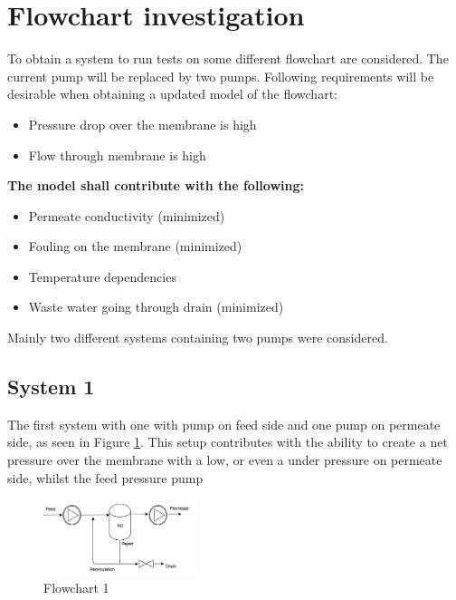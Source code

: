 
\section{Flowchart investigation}
To obtain a system to run tests on some different flowchart are considered. The current pump will be replaced by two pumps. Following requirements will be desirable when obtaining a updated model of the flowchart:
\begin{itemize}
\renewcommand\labelitemi{ }
\item Pressure drop over the membrane is high
\item Flow through membrane is high
\end{itemize}
\textbf{The model shall contribute with the following:}
\begin{itemize}
\renewcommand\labelitemi{ }
\item Permeate conductivity (minimized)
\item Fouling on the membrane (minimized)
\item Temperature dependencies 
\item Waste water going through drain (minimized)
\end{itemize}

Mainly two different systems containing two pumps were considered. 

\subsection{System 1}
The first system with one with pump on feed side and one pump on permeate side, as seen in Figure \ref{fig:FlowCInves1}. This setup contributes with the ability to create a net pressure over the membrane with a low, or even a under pressure on permeate side, whilst the feed pressure pump

\begin{figure}[h]
    \centering
    \includegraphics[width=0.4\textwidth]{FlowCInves1}
    \caption{Flowchart 1}
    \label{fig:FlowCInves1}
\end{figure}


